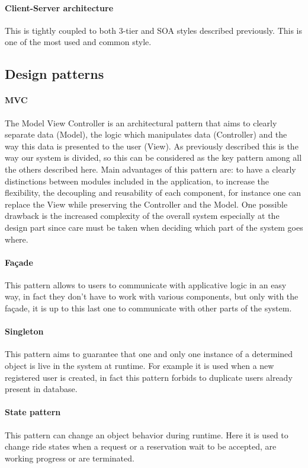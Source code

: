 \paragraph{Client-Server architecture}
This is tightly coupled to both 3-tier and SOA styles described previously. This is one of the most used and common style.
\subsection{Design patterns}
\paragraph{MVC}
The Model View Controller is an architectural pattern that aims to clearly separate data (Model), the logic which manipulates data (Controller) and the way this data is presented to the user (View). As previously described this is the way our system is divided, so this can be considered as the key pattern among all the others described here. Main advantages of this pattern are: to have a clearly distinctions between modules included in the application, to increase the flexibility, the decoupling and reusability of each component, for instance one can replace the View while preserving the Controller and the Model. One possible drawback is the increased complexity of the overall system especially at the design part since care must be taken when deciding which part of the system goes where.
\paragraph{Fa\c{c}ade}
This pattern allows to users to communicate with applicative logic in an easy way, in fact they don't have to work with various components, but only with the fa\c{c}ade, it is up to this last one to communicate with other parts of the system.
\paragraph{Singleton}
This pattern aims to guarantee that one and only one instance of a determined object is live in the system at runtime. For example it is used when a new registered user is created, in fact this pattern forbids to duplicate users already present in database. 
\paragraph{State pattern}
This pattern can change an object behavior during runtime. Here it is used to change ride states when a request or a reservation wait to be accepted, are working progress or are terminated.
